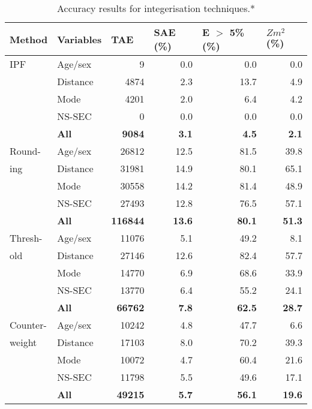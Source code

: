 \begin{table}[]
\caption{Accuracy results for integerisation techniques.*}
\small{
\begin{center}
\begin{tabular}{llrrrr}
\toprule
Method & Variables & \multicolumn{1}{l}{TAE} & \multicolumn{1}{l}{SAE (\%)} &
\multicolumn{1}{l}{E $>$ 5\% (\%)} & \multicolumn{1}{l}{$Z{m}^{2}$ (\%)} \\
\midrule
IPF & Age/sex & 9 & 0.0 & 0.0 & 0.0 \\
 & Distance & 4874 & 2.3 & 13.7 & 4.9 \\
 & Mode & 4201 & 2.0 & 6.4 & 4.2 \\
 & NS-SEC & 0 & 0.0 & 0.0 & 0.0 \\
\textbf{} & \textbf{All} & \textbf{9084} & \textbf{3.1} & \textbf{4.5} &
\textbf{2.1} \\
\midrule
Round- & Age/sex & 26812 & 12.5 & 81.5 & 39.8 \\
 ing& Distance & 31981 & 14.9 & 80.1 & 65.1 \\
 & Mode & 30558 & 14.2 & 81.4 & 48.9 \\
 & NS-SEC & 27493 & 12.8 & 76.5 & 57.1 \\
 & \textbf{All} & \textbf{116844} & \textbf{13.6} & \textbf{80.1} &
\textbf{51.3} \\
\midrule
Thresh- & Age/sex &  11076 & 5.1 & 49.2 & 8.1 \\
 old& Distance & 27146 & 12.6 & 82.4 & 57.7 \\
 & Mode & 14770 & 6.9 & 68.6 & 33.9 \\
 & NS-SEC & 13770 & 6.4 & 55.2 & 24.1 \\
 & \textbf{All} &  \textbf{66762} & \textbf{7.8} & \textbf{62.5} & \textbf{28.7}
\\
\midrule
Counter- & Age/sex & 10242 & 4.8 & 47.7 & 6.6 \\
weight& Distance &  17103 & 8.0 & 70.2 & 39.3 \\
 & Mode &  10072 & 4.7 & 60.4 & 21.6 \\
 & NS-SEC & 11798 & 5.5 & 49.6 & 17.1 \\
 & \textbf{All} & \textbf{49215} & \textbf{5.7} & \textbf{56.1} & \textbf{19.6}
\\
\midrule


\end{tabular}
\end{center}}
\end{table}
